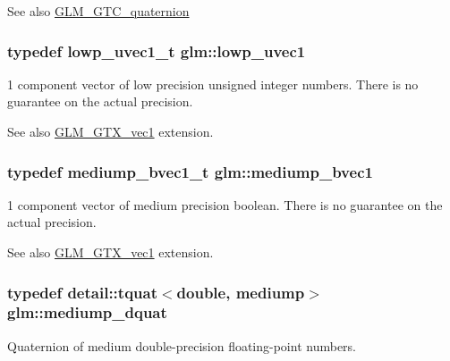 \begin{DoxySeeAlso}{See also}
\hyperlink{group__gtc__quaternion}{G\+L\+M\+\_\+\+G\+T\+C\+\_\+quaternion} 
\end{DoxySeeAlso}
\subsubsection[{\texorpdfstring{lowp\+\_\+uvec1}{lowp_uvec1}}]{\setlength{\rightskip}{0pt plus 5cm}typedef {\bf lowp\+\_\+uvec1\+\_\+t} {\bf glm\+::lowp\+\_\+uvec1}}\hypertarget{namespaceglm_ad50d8a6d477675ffc627f0949f1d5615}{}\label{namespaceglm_ad50d8a6d477675ffc627f0949f1d5615}
1 component vector of low precision unsigned integer numbers. There is no guarantee on the actual precision. \begin{DoxySeeAlso}{See also}
\hyperlink{group__gtx__vec1}{G\+L\+M\+\_\+\+G\+T\+X\+\_\+vec1} extension. 
\end{DoxySeeAlso}
\subsubsection[{\texorpdfstring{mediump\+\_\+bvec1}{mediump_bvec1}}]{\setlength{\rightskip}{0pt plus 5cm}typedef {\bf mediump\+\_\+bvec1\+\_\+t} {\bf glm\+::mediump\+\_\+bvec1}}\hypertarget{namespaceglm_a6c2cab6a7010331621a5ce656dd5f58d}{}\label{namespaceglm_a6c2cab6a7010331621a5ce656dd5f58d}
1 component vector of medium precision boolean. There is no guarantee on the actual precision. \begin{DoxySeeAlso}{See also}
\hyperlink{group__gtx__vec1}{G\+L\+M\+\_\+\+G\+T\+X\+\_\+vec1} extension. 
\end{DoxySeeAlso}
\subsubsection[{\texorpdfstring{mediump\+\_\+dquat}{mediump_dquat}}]{\setlength{\rightskip}{0pt plus 5cm}typedef {\bf detail\+::tquat}$<$double, mediump$>$ {\bf glm\+::mediump\+\_\+dquat}}\hypertarget{namespaceglm_a302e27293c89ef6128f4eb14ea06ec8b}{}\label{namespaceglm_a302e27293c89ef6128f4eb14ea06ec8b}
Quaternion of medium double-\/precision floating-\/point numbers.

